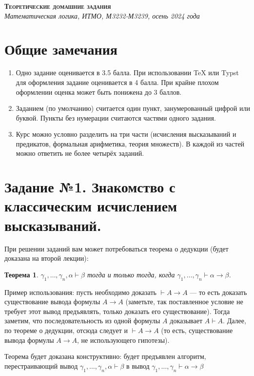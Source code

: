 \documentclass[10pt,a4paper,oneside]{article}
\newtheorem{theorem}{Теорема}
\begin{document}
\begin{center}{\Large\textsc{\textbf{Теоретические домашние задания}}}\\
             \it Математическая логика, ИТМО, М3232-М3239, осень 2024 года\end{center}

\section*{Общие замечания}

\begin{enumerate}
\item Одно задание оценивается в 3.5 балла. При использовании TeX или Typst для оформления задание оценивается в 4 балла. При крайне плохом оформлении оценка может быть понижена до 3 баллов.
\item Заданием (по умолчанию) считается один пункт, занумерованный цифрой или буквой. Пункты без нумерации считаются частями одного задания.
\item Курс можно условно разделить на три части (исчисления высказываний и предикатов, формальная арифметика, теория множеств). В каждой из частей можно ответить не более четырёх заданий.
\end{enumerate}

\section*{Задание №1. Знакомство с классическим исчислением высказываний.}

При решении заданий вам может потребоваться теорема о дедукции (будет доказана на второй лекции): 
\begin{theorem}
$\gamma_1,\dots,\gamma_n, \alpha \vdash \beta$ 
тогда и только тогда, когда $\gamma_1,\dots,\gamma_n \vdash \alpha\rightarrow\beta$. 
\end{theorem}

Пример использования: пусть необходимо доказать $\vdash A \rightarrow A$ --- то есть
доказать существование вывода формулы $A \rightarrow A$ (заметьте, так поставленное
условие не требует этот вывод предъявлять, только доказать его существование).
Тогда заметим, что последовательность из одной формулы $A$ доказывает $A \vdash A$. 
Далее, по теореме о дедукции, отсюда следует и $\vdash A \rightarrow A$ 
(то есть, существование вывода формулы $A \rightarrow A$, не использующего гипотезы).

Теорема будет доказана конструктивно: будет предъявлен алгоритм,
перестраивающий вывод $\gamma_1,\dots,\gamma_n, \alpha \vdash \beta$ 
в вывод $\gamma_1,\dots,\gamma_n \vdash \alpha\rightarrow\beta$ 
\end{document}
